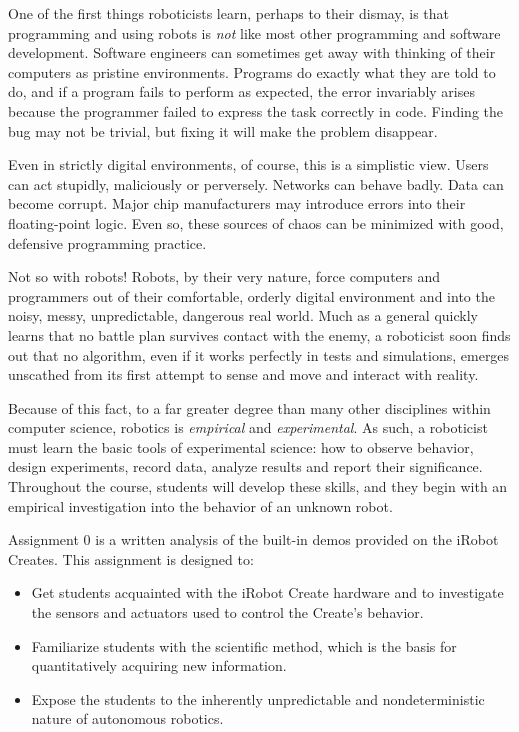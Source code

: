 One of the first things roboticists learn, perhaps to their dismay, is
that programming and using robots is \emph{not} like most other
programming and software development.  Software engineers can
sometimes get away with thinking of their computers as pristine
environments.  Programs do exactly what they are told to do, and if a
program fails to perform as expected, the error invariably arises
because the programmer failed to express the task correctly in code.
Finding the bug may not be trivial, but fixing it will make the
problem disappear.

Even in strictly digital environments, of course, this is a simplistic
view.  Users can act stupidly, maliciously or perversely.  Networks
can behave badly.  Data can become corrupt.  Major chip manufacturers
may introduce errors into their floating-point logic.  Even so, these
sources of chaos can be minimized with good, defensive programming
practice.

Not so with robots!  Robots, by their very nature, force computers and
programmers out of their comfortable, orderly digital environment and
into the noisy, messy, unpredictable, dangerous real world.  Much as a
general quickly learns that no battle plan survives contact with the
enemy, a roboticist soon finds out that no algorithm, even if it works
perfectly in tests and simulations, emerges unscathed from its first
attempt to sense and move and interact with reality.

Because of this fact, to a far greater degree than many other
disciplines within computer science, robotics is \emph{empirical}
and \emph{experimental}.  As such, a roboticist must learn the basic
tools of experimental science: how to observe behavior, design
experiments, record data, analyze results and report their
significance.  Throughout the course, students will develop these
skills, and they begin with an empirical investigation into the
behavior of an unknown robot.


Assignment 0 is a written analysis of the built-in demos provided on the iRobot Creates.  This assignment is designed to:\\
\begin{itemize}
\item Get students acquainted with the iRobot Create hardware and to investigate the sensors and actuators used to control the Create's behavior.
\item Familiarize students with the scientific method, which is the basis for quantitatively acquiring new information.
\item Expose the students to the inherently unpredictable and nondeterministic nature of autonomous robotics.
\end{itemize}

